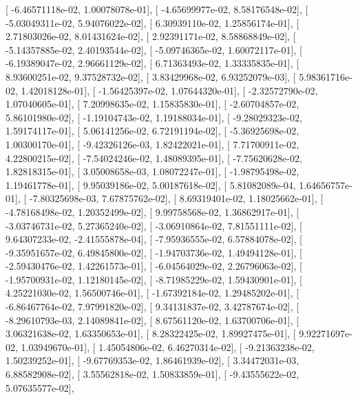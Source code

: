 \documentclass{article}
\begin{document}
       [ -6.46571118e-02,   1.00078078e-01],
       [ -4.65699977e-02,   8.58176548e-02],
       [ -5.03049311e-02,   5.94076022e-02],
       [  6.30939110e-02,   1.25856174e-01],
       [  2.71803026e-02,   8.01431624e-02],
       [  2.92391171e-02,   8.58868849e-02],
       [ -5.14357885e-02,   2.40193544e-02],
       [ -5.09746365e-02,   1.60072117e-01],
       [ -6.19389047e-02,   2.96661129e-02],
       [  6.71363493e-02,   1.33335835e-01],
       [  8.93600251e-02,   9.37528732e-02],
       [  3.83429968e-02,   6.93252079e-03],
       [  5.98361716e-02,   1.42018128e-01],
       [ -1.56425397e-02,   1.07644320e-01],
       [ -2.32572790e-02,   1.07040605e-01],
       [  7.20998635e-02,   1.15835830e-01],
       [ -2.60704857e-02,   5.86101980e-02],
       [ -1.19104743e-02,   1.19188034e-01],
       [ -9.28029323e-02,   1.59174117e-01],
       [  5.06141256e-02,   6.72191194e-02],
       [ -5.36925698e-02,   1.00300170e-01],
       [ -9.42326126e-03,   1.82422021e-01],
       [  7.71700911e-02,   4.22800215e-02],
       [ -7.54024246e-02,   1.48089395e-01],
       [ -7.75620628e-02,   1.82818315e-01],
       [  3.05008658e-03,   1.08072247e-01],
       [ -1.98795498e-02,   1.19461778e-01],
       [  9.95039186e-02,   5.00187618e-02],
       [  5.81082089e-04,   1.64656757e-01],
       [ -7.80325698e-03,   7.67875762e-02],
       [  8.69319401e-02,   1.18025662e-01],
       [ -4.78168498e-02,   1.20352499e-02],
       [  9.99758568e-02,   1.36862917e-01],
       [ -3.03746731e-02,   5.27365240e-02],
       [ -3.06910864e-02,   7.81551111e-02],
       [  9.64307233e-02,  -2.41555878e-04],
       [ -7.95936555e-02,   6.57884078e-02],
       [ -9.35951657e-02,   6.49845800e-02],
       [ -1.94703736e-02,   1.49494128e-01],
       [ -2.59430476e-02,   1.42261573e-01],
       [ -6.04564029e-02,   2.26796063e-02],
       [ -1.95700931e-02,   1.12180145e-02],
       [ -8.71985229e-02,   1.59430901e-01],
       [  4.25221030e-02,   1.56500746e-01],
       [ -1.67392184e-02,   1.29485202e-01],
       [ -6.86467764e-02,   7.97991820e-02],
       [  9.34131837e-02,   3.42787674e-02],
       [ -8.29610793e-03,   2.14089841e-02],
       [  8.67561120e-02,   1.63700706e-01],
       [  3.06321638e-02,   1.63350653e-01],
       [  8.28322425e-02,   1.89927475e-01],
       [  9.92271697e-02,   1.03949670e-01],
       [  1.45054806e-02,   6.46270314e-02],
       [ -9.21363238e-02,   1.50239252e-01],
       [ -9.67769353e-02,   1.86461939e-02],
       [  3.34472031e-03,   6.88582908e-02],
       [  3.55562818e-02,   1.50833859e-01],
       [ -9.43555622e-02,   5.07635577e-02],
\end{document}
